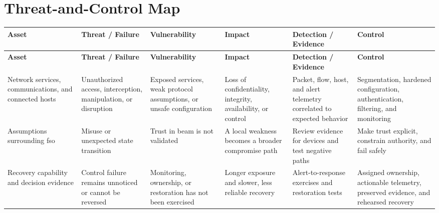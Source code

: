 \documentclass[11pt]{article}
\begin{document}
\section*{Threat-and-Control Map}
\begingroup\scriptsize\setlength{\tabcolsep}{2pt}
\begin{longtable}{>{\RaggedRight\arraybackslash}p{}>{\RaggedRight\arraybackslash}p{}>{\RaggedRight\arraybackslash}p{}>{\RaggedRight\arraybackslash}p{}>{\RaggedRight\arraybackslash}p{}>{\RaggedRight\arraybackslash}p{}}
\toprule\rowcolor{Navy}\color{white}\textbf{Asset} & \color{white}\textbf{Threat / Failure} & \color{white}\textbf{Vulnerability} & \color{white}\textbf{Impact} & \color{white}\textbf{Detection / Evidence} & \color{white}\textbf{Control}\\\midrule
\endfirsthead
\toprule\rowcolor{Navy}\color{white}\textbf{Asset} & \color{white}\textbf{Threat / Failure} & \color{white}\textbf{Vulnerability} & \color{white}\textbf{Impact} & \color{white}\textbf{Detection / Evidence} & \color{white}\textbf{Control}\\\midrule
\endhead
Network services, communications, and connected hosts & Unauthorized access, interception, manipulation, or disruption & Exposed services, weak protocol assumptions, or unsafe configuration & Loss of confidentiality, integrity, availability, or control & Packet, flow, host, and alert telemetry correlated to expected behavior & Segmentation, hardened configuration, authentication, filtering, and monitoring\\\midrule
Assumptions surrounding fso & Misuse or unexpected state transition & Trust in beam is not validated & A local weakness becomes a broader compromise path & Review evidence for devices and test negative paths & Make trust explicit, constrain authority, and fail safely\\\midrule
Recovery capability and decision evidence & Control failure remains unnoticed or cannot be reversed & Monitoring, ownership, or restoration has not been exercised & Longer exposure and slower, less reliable recovery & Alert-to-response exercises and restoration tests & Assigned ownership, actionable telemetry, preserved evidence, and rehearsed recovery\\\midrule
\bottomrule
\end{longtable}
\endgroup
\end{document}
